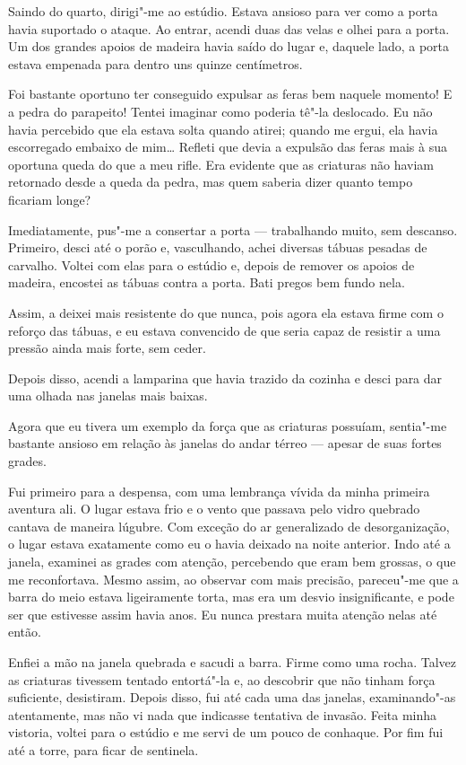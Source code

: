 Saindo do quarto, dirigi"-me ao estúdio. Estava ansioso para ver como a porta havia suportado o ataque. Ao entrar,
acendi duas das velas e olhei para a porta. Um dos grandes apoios de madeira havia saído do lugar e, daquele lado, a
porta estava empenada para dentro uns quinze centímetros.

Foi bastante oportuno ter conseguido expulsar as feras bem naquele momento! E a pedra do parapeito! Tentei
imaginar como poderia tê"-la deslocado. Eu não havia percebido que ela estava solta quando atirei; quando me ergui,
ela havia escorregado embaixo de mim\ldots{} Refleti que devia a expulsão das feras mais à sua oportuna queda do que a meu
rifle. Era evidente que as criaturas não haviam retornado desde a queda da pedra, mas quem saberia dizer quanto tempo
ficariam longe?

Imediatamente, pus"-me a consertar a porta --- trabalhando muito, sem descanso. Primeiro, desci até o porão e,
vasculhando, achei diversas tábuas pesadas de carvalho. Voltei com elas para o estúdio e, depois de remover os apoios
de madeira, encostei as tábuas contra a porta. Bati pregos bem fundo nela.

Assim, a deixei mais resistente do que nunca, pois agora ela estava firme com o reforço das tábuas, e eu estava
convencido de que seria capaz de resistir a uma pressão ainda mais forte, sem ceder.

Depois disso, acendi a lamparina que havia trazido da cozinha e desci para dar uma olhada nas janelas mais baixas.

Agora que eu tivera um exemplo da força que as criaturas possuíam, sentia"-me bastante ansioso em relação às
janelas do andar térreo --- apesar de suas fortes grades.

Fui primeiro para a despensa, com uma lembrança vívida da minha primeira aventura ali. O lugar estava frio e o vento
que passava pelo vidro quebrado cantava de maneira lúgubre. Com exceção do ar generalizado de desorganização, o lugar
estava exatamente como eu o havia deixado na noite anterior. Indo até a janela, examinei as grades com atenção,
percebendo que eram bem grossas, o que me reconfortava. Mesmo assim, ao observar com mais precisão, pareceu"-me que a
barra do meio estava ligeiramente torta, mas era um desvio insignificante, e pode ser que estivesse assim havia anos. Eu
nunca prestara muita atenção nelas até então.

Enfiei a mão na janela quebrada e sacudi a barra. Firme como uma rocha. Talvez as criaturas tivessem tentado entortá"-la
e, ao descobrir que não tinham força suficiente, desistiram. Depois disso, fui até cada uma das janelas, examinando"-as
atentamente, mas não vi nada que indicasse tentativa de invasão. Feita minha vistoria, voltei para o estúdio e me servi
de um pouco de conhaque. Por fim fui até a torre, para ficar de sentinela.


